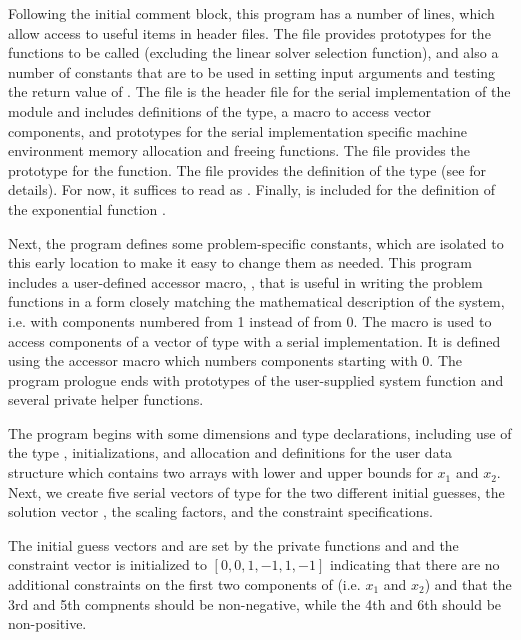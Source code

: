 Following the initial comment block, this program has a number
of  lines, which allow access to useful items in {\cvode}
header files. 
The  file provides prototypes for the {\kinsol}
functions to be called (excluding the linear solver selection
function), and also a number of constants that are to be used in
setting input arguments and testing the return value of .
The  file is the header file for the serial
implementation of the {\nvector} module and includes definitions of the 
 type, a macro to access vector components, and prototypes 
for the serial implementation specific machine environment memory allocation
and freeing functions.
The  file provides the prototype for the  function.
The  file provides the definition of the
type  (see  for details).  
For now, it suffices to read  as .
Finally,  is included for the definition of the
exponential function .

Next, the program defines some problem-specific constants, which are
isolated to this early location to make it easy to change them as needed.  
This program includes a user-defined accessor macro, , that
is useful in writing the problem functions in a form closely matching 
the mathematical description of the system, i.e. with components numbered 
from 1 instead of from 0. The  macro is used to access components 
of a vector of type  with a serial implementation.  
It is defined using the {\nvecs} accessor macro  which 
numbers components starting with 0.
The program prologue ends with prototypes of the user-supplied system function 
 and several private helper functions.

The  program begins with some dimensions and type declarations,
including use of the type , initializations, and allocation
and definitions for the user data structure  which contains two
arrays with lower and upper bounds for $x_1$ and $x_2$. Next, we create five
serial vectors of type  for the two different initial guesses,
the solution vector , the scaling factors, and the constraint specifications.

The initial guess vectors  and  are set by the private
functions  and  and the constraint
vector  is initialized to $[0,0,1,-1,1,-1]$ indicating that there are
no additional constraints on the first two components of  (i.e. $x_1$ and 
$x_2$) and that the 3rd and 5th compnents should be non-negative, while
the 4th and 6th should be non-positive.

